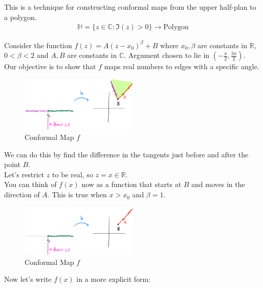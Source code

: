 \begin{definition}
    This is a technique for constructing conformal maps from the upper half-plan to a polygon.
    \begin{align*}
        \mathbb{H} = \{z \in \mathbb{C} : \Im (z) > 0\} \to \text{Polygon}
    \end{align*}
\end{definition}

\begin{proposition}
    Consider the function $f(z) = A(z - x_0)^\beta + B$ where $x_0, \beta$ are constants in $\mathbb{R}$, $0 < \beta < 2$ and $A, B$ are constants in $\mathbb{C}$. Argument chosen to lie in $(-\frac{\pi}{2}, \frac{3\pi}{2})$. \\

    Our objective is to show that $f$ maps real numbers to edges with a specific angle.
    \begin{figure}[H]
        \centering
        \includegraphics[width=0.5\textwidth]{LECTURE_17/graph6.png}
        \caption{Conformal Map $f$}
    \end{figure}
    We can do this by find the difference in the tangents just before and after the point $B$.\\
    Let's restrict $z$ to be real, so $z = x \in \mathbb{R}$.\\
    You can think of $f(x)$ now as a function that starts at $B$ and moves in the direction of $A$. This is true when $x > x_0$ and $\beta = 1$.\\
    \begin{figure}[H]
        \centering
        \includegraphics[width=0.5\textwidth]{LECTURE_17/graph7.png}
        \caption{Conformal Map $f$}
    \end{figure}
    Now let's write $f(x)$ in a more explicit form:
    \begin{align*}

\end{align*}
\end{proposition}
